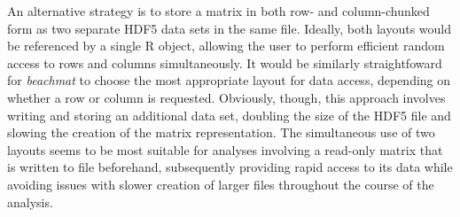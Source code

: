 \documentclass{article}
\newcommand{\beachmat}{\textit{beachmat}}
\begin{document}
An alternative strategy is to store a matrix in both row- and column-chunked form as two separate HDF5 data sets in the same file.
Ideally, both layouts would be referenced by a single R object, allowing the user to perform efficient random access to rows and columns simultaneously.
It would be similarly straightfoward for \beachmat{} to choose the most appropriate layout for data access, depending on whether a row or column is requested.
Obviously, though, this approach involves writing and storing an additional data set, doubling the size of the HDF5 file and slowing the creation of the matrix representation.
The simultaneous use of two layouts seems to be most suitable for analyses involving a read-only matrix that is written to file beforehand, subsequently providing rapid access to its data while avoiding issues with slower creation of larger files throughout the course of the analysis.
\end{document}
